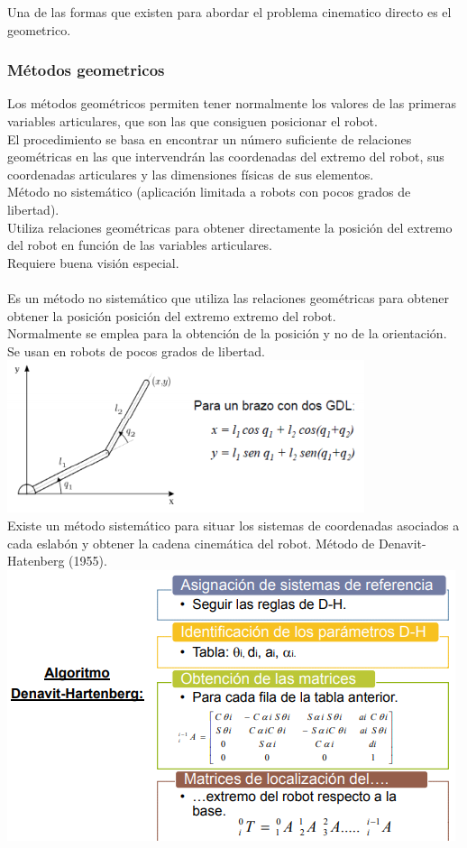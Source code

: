 \documentclass[12pt,a4paper]{article}
\begin{document}
Una de las formas que existen para abordar el problema cinematico directo es el geometrico.\\
\subsubsection{Métodos geometricos}
Los métodos geométricos permiten tener normalmente los valores de las primeras variables articulares, que son las que consiguen posicionar el robot.\\
El procedimiento se basa en encontrar un número suficiente de relaciones geométricas en las que intervendrán las coordenadas del extremo del robot, sus coordenadas articulares y las dimensiones físicas de sus elementos.\\
Método no sistemático (aplicación limitada a robots con pocos grados de libertad).\\
Utiliza relaciones geométricas para obtener directamente la posición del extremo del robot en función de las variables articulares.\\
Requiere buena visión especial.\\\\
Es un método no sistemático que utiliza las relaciones geométricas para obtener obtener la posición posición del extremo extremo del robot.\\
Normalmente se emplea para la obtención de la posición y no de la orientación.\\
Se usan en robots de pocos grados de libertad.\\
\includegraphics[scale=1.5]{2.PNG} \\
Existe un método sistemático para situar los sistemas de coordenadas asociados a cada eslabón y obtener la cadena cinemática del robot.
Método de Denavit-Hatenberg (1955).\\
\includegraphics[scale=1]{D-H.PNG} \\
\end{document}
